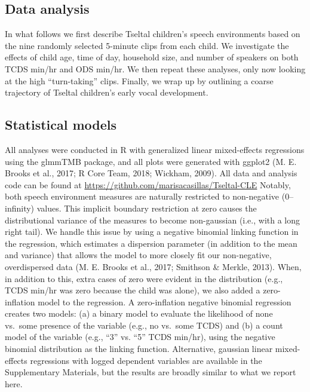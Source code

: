 \documentclass[,man,floatsintext]{apa6}
\begin{document}
\subsection{Data analysis}\label{methods-analysisinfo}

In what follows we first describe Tseltal children's speech environments
based on the nine randomly selected 5-minute clips from each child. We
investigate the effects of child age, time of day, household size, and
number of speakers on both TCDS min/hr and ODS min/hr. We then repeat
these analyses, only now looking at the high \enquote{turn-taking}
clips. Finally, we wrap up by outlining a coarse trajectory of Tseltal
children's early vocal development.

\subsection{Statistical models}\label{statistical-models}

All analyses were conducted in R with generalized linear mixed-effects
regressions using the glmmTMB package, and all plots were generated with
ggplot2 (M. E. Brooks et al., 2017; R Core Team, 2018; Wickham, 2009).
All data and analysis code can be found at
\url{https://github.com/marisacasillas/Tseltal-CLE} Notably, both speech
environment measures are naturally restricted to non-negative
(0--infinity) values. This implicit boundary restriction at zero causes
the distributional variance of the measures to become non-gaussian
(i.e., with a long right tail). We handle this issue by using a negative
binomial linking function in the regression, which estimates a
dispersion parameter (in addition to the mean and variance) that allows
the model to more closely fit our non-negative, overdispersed data (M.
E. Brooks et al., 2017; Smithson \& Merkle, 2013). When, in addition to
this, extra cases of zero were evident in the distribution (e.g., TCDS
min/hr was zero because the child was alone), we also added a
zero-inflation model to the regression. A zero-inflation negative
binomial regression creates two models: (a) a binary model to evaluate
the likelihood of none vs.~some presence of the variable (e.g., no
vs.~some TCDS) and (b) a count model of the variable (e.g., \enquote{3}
vs. \enquote{5} TCDS min/hr), using the negative binomial distribution
as the linking function. Alternative, gaussian linear mixed-effects
regressions with logged dependent variables are available in the
Supplementary Materials, but the results are broadly similar to what we
report here.
\end{document}
